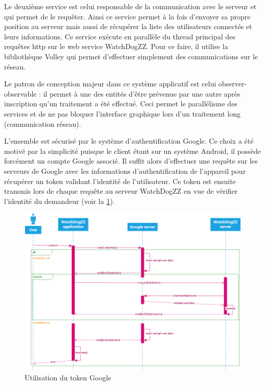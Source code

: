         Le deuxième service est celui responsable de la communication avec le serveur et qui permet de le requêter. Ainsi ce service permet à la fois d’envoyer sa propre position au serveur mais aussi de récupérer la liste des utilisateurs connectés et leurs informations. Ce service exécute en parallèle du thread principal des requêtes http sur le web service WatchDogZZ. Pour ce faire, il utilise la bibliothèque Volley qui permet d’effectuer simplement des communications sur le réseau.

        Le patron de conception majeur dans ce système applicatif est celui observer-observable : il permet à une des entités d’être prévenue par une autre après inscription qu’un traitement a été effectué. Ceci permet le parallélisme des services et de ne pas bloquer l’interface graphique lors d’un traitement long (communication réseau).

        L’ensemble est sécurisé par le système d’authentification Google. Ce choix a été motivé par la simplicité puisque le client étant sur un système Android, il possède forcément un compte Google associé. Il suffit alors d’effectuer une requête sur les serveurs de Google avec les informations d’authentification de l’appareil pour récupérer un token validant l’identité de l’utilisateur. Ce token est ensuite transmis lors de chaque requête au serveur WatchDogZZ en vue de vérifier l’identité du demandeur (voir la \ref{token}).

        \begin{figure}[H]
            \centering
            \includegraphics{./img/android-token.png}
            \caption{Utilisation du token Google}
            \label{token}
        \end{figure}

